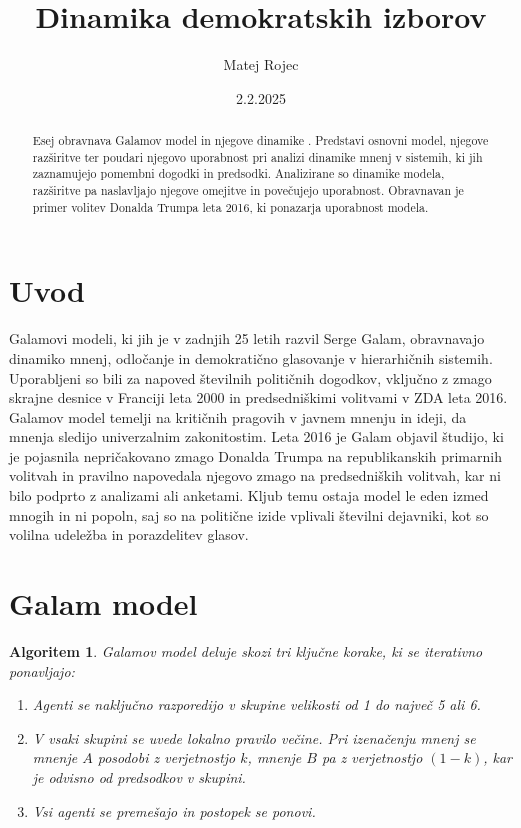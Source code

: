 \documentclass[a4paper,12pt]{article}
\title{Dinamika demokratskih izborov}
\author{Matej Rojec}
\date{2.2.2025}
\newtheorem{algoritem}{Algoritem}
\begin{document}
\maketitle
\begin{abstract}
    Esej obravnava Galamov model in njegove dinamike \cite{galam2015stubbornness, galam2016trump, galam2020tipping}. Predstavi osnovni model, njegove razširitve ter poudari njegovo uporabnost pri 
    analizi dinamike mnenj v sistemih, ki jih zaznamujejo pomembni dogodki in predsodki. 
    Analizirane so dinamike modela, razširitve pa naslavljajo njegove omejitve in 
    povečujejo uporabnost. Obravnavan je primer volitev Donalda Trumpa leta 2016, 
    ki ponazarja uporabnost modela.
\end{abstract}

\section{Uvod}

Galamovi modeli, ki jih je v zadnjih 25 letih razvil Serge Galam, obravnavajo dinamiko mnenj, 
odločanje in demokratično glasovanje v hierarhičnih sistemih. 
Uporabljeni so bili za napoved številnih političnih dogodkov, vključno z zmago skrajne desnice 
v Franciji leta 2000 in predsedniškimi volitvami v ZDA leta 2016. Galamov model temelji na 
kritičnih pragovih v javnem mnenju in ideji, da mnenja sledijo univerzalnim zakonitostim. 
Leta 2016 je Galam objavil študijo, ki je pojasnila nepričakovano zmago Donalda Trumpa na 
republikanskih primarnih volitvah in pravilno napovedala njegovo zmago na predsedniških volitvah, 
kar ni bilo podprto z analizami ali anketami. 
Kljub temu ostaja model le eden izmed mnogih in ni popoln, saj so na politične izide vplivali 
številni dejavniki, kot so volilna udeležba in porazdelitev glasov.

\section{Galam model}

\begin{algoritem}
    Galamov model deluje skozi tri ključne korake, ki se iterativno ponavljajo:   

    \begin{enumerate}
    \item Agenti se naključno razporedijo v skupine velikosti od 1 do največ 5 ali 6.
    
    \item V vsaki skupini se uvede lokalno pravilo večine. Pri izenačenju mnenj se mnenje $A$ posodobi z 
    verjetnostjo $k$, mnenje $B$ pa z verjetnostjo $(1-k)$, kar je odvisno od predsodkov v skupini.
    
    \item Vsi agenti se premešajo in postopek se ponovi.
    \end{enumerate}
\end{algoritem}
\end{document}
